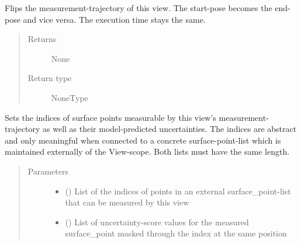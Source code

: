 \documentclass[letterpaper,10pt,english]{sphinxmanual}
\begin{document}
\begin{fulllineitems}

\begin{fulllineitems}
\label{\detokenize{module_view:agiprobot_measurement.view.View.reverse_trajectory_for_measurement}}
Flips the measurement-trajectory of this view. The start-pose becomes the end-pose and vice versa. The execution time stays the same.
\begin{quote}\begin{description}
\item[{Returns}] \leavevmode
None

\item[{Return type}] \leavevmode
NoneType

\end{description}\end{quote}

\end{fulllineitems}


\begin{fulllineitems}
\label{\detokenize{module_view:agiprobot_measurement.view.View.set_measurable_surface_point_indices_and_scores}}
Sets the indices of surface points measurable by this view’s measurement-trajectory as well as their model-predicted uncertainties. 
The indices are abstract and only meaningful when connected to a concrete surface-point-list which is maintained externally of the View-scope.
Both lists must have the same length.
\begin{quote}\begin{description}
\item[{Parameters}] \leavevmode\begin{itemize}
\item {} 
 (\sphinxstyleliteralemphasis{{[}}\sphinxstyleliteralemphasis{{]}}) \textendash{} List of the indices of points in an external surface\_point-list that can be measured by this view

\item {} 
 (\sphinxstyleliteralemphasis{{[}}\sphinxstyleliteralemphasis{{]}}) \textendash{} List of uncertainty-score values for the measured surface\_point masked through the index at the same position


\end{itemize}
\end{description}
\end{quote}
\end{fulllineitems}
\end{fulllineitems}
\end{document}

